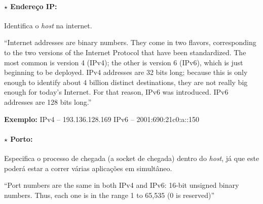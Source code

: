 \paragraph[2.1.4.1 Endereço IP]{$\pmb{\star}$ Endereço IP:} Identifica o \textit{host} na internet.

\begin{mdframed}
    ``Internet addresses are binary numbers. They come in two flavors, corresponding to the two versions of the Internet Protocol that have been standardized. The most common is version 4 (IPv4); the other is version 6 (IPv6), which is just beginning to be deployed. IPv4 addresses are 32 bits long; because this is only enough to identify about 4 billion distinct destinations, they are not really big enough for today’s Internet. For that reason, IPv6 was introduced. IPv6 addresses are 128 bits long.''\cite{Donahoo-Kenneth2002}
    
    \vspace{1 em}
    \noindent \textbf{Exemplo:} IPv4 – 193.136.128.169 \hspace*{0.75em} IPv6 – 2001:690:21c0:a::150
\end{mdframed}

\paragraph[2.1.4.2 Porto]{$\pmb{\star}$ Porto:} Especifica o processo de chegada (a socket de chegada) dentro do \textit{host}, já que este poderá estar a correr várias aplicações em simultâneo.

\begin{mdframed}
    ``Port numbers are the same in both IPv4 and IPv6: 16-bit unsigned binary numbers. Thus, each one is in the range 1 to 65,535 (0 is reserved)''\cite{Donahoo-Kenneth2002}
\end{mdframed}

